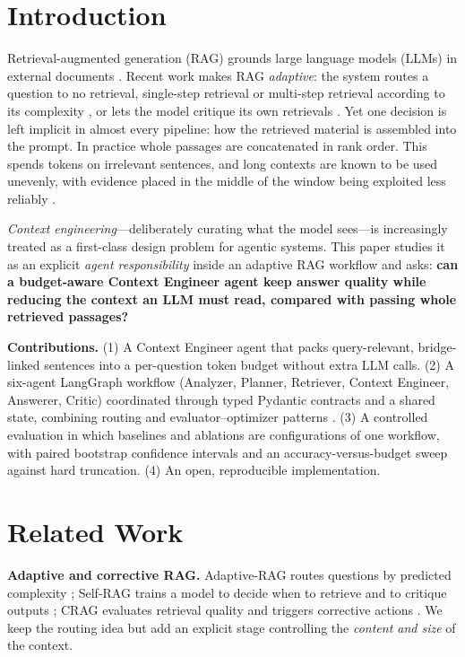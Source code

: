 \documentclass[conference]{IEEEtran}
\begin{document}
\section{Introduction}
Retrieval-augmented generation (RAG) grounds large language models (LLMs) in external documents \cite{lewis2020rag}.
Recent work makes RAG \emph{adaptive}: the system routes a question to no retrieval, single-step retrieval or
multi-step retrieval according to its complexity \cite{jeong2024adaptive}, or lets the model critique its own
retrievals \cite{asai2024selfrag,yan2024crag}. Yet one decision is left implicit in almost every pipeline: how the
retrieved material is assembled into the prompt. In practice whole passages are concatenated in rank order. This
spends tokens on irrelevant sentences, and long contexts are known to be used unevenly, with evidence placed in the
middle of the window being exploited less reliably \cite{liu2024lost}.

\emph{Context engineering}---deliberately curating what the model sees---is increasingly treated as a first-class design
problem for agentic systems. This paper studies it as an explicit \emph{agent responsibility} inside an adaptive RAG
workflow and asks: \textbf{can a budget-aware Context Engineer agent keep answer quality while reducing the
context an LLM must read, compared with passing whole retrieved passages?}

\textbf{Contributions.}
(1) A Context Engineer agent that packs query-relevant, bridge-linked sentences into a per-question token budget
without extra LLM calls. (2) A six-agent LangGraph workflow (Analyzer, Planner, Retriever, Context Engineer,
Answerer, Critic) coordinated through typed Pydantic contracts and a shared state, combining routing and
evaluator--optimizer patterns \cite{anthropic2024agents}. (3) A controlled evaluation in which baselines and
ablations are configurations of one workflow, with paired bootstrap confidence intervals and an accuracy-versus-budget
sweep against hard truncation. (4) An open, reproducible implementation.

\section{Related Work}
\textbf{Adaptive and corrective RAG.} Adaptive-RAG routes questions by predicted complexity \cite{jeong2024adaptive};
Self-RAG trains a model to decide when to retrieve and to critique outputs \cite{asai2024selfrag}; CRAG evaluates
retrieval quality and triggers corrective actions \cite{yan2024crag}. We keep the routing idea but add an explicit
stage controlling the \emph{content and size} of the context.
\end{document}
